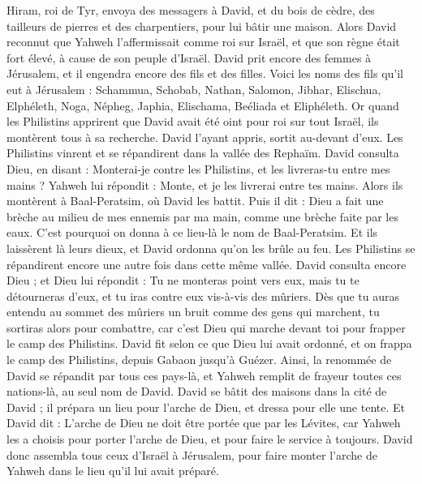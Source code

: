 \begin{multicols}{2}
\VerseOne{}Hiram, roi de Tyr, envoya des messagers à David, et du bois de cèdre, des tailleurs de pierres et des charpentiers, pour lui bâtir une maison.
Alors David reconnut que Yahweh l'affermissait comme roi sur Israël, et que son règne était fort élevé, à cause de son peuple d'Israël.
David prit encore des femmes à Jérusalem, et il engendra encore des fils et des filles.
Voici les noms des fils qu'il eut à Jérusalem : Schammua, Schobab, Nathan, Salomon,
Jibhar, Elischua, Elphéleth,
Noga, Népheg, Japhia,
Elischama, Beéliada et Eliphéleth.
Or quand les Philistins apprirent que David avait été oint pour roi sur tout Israël, ils montèrent tous à sa recherche. David l'ayant appris, sortit au-devant d'eux.
Les Philistins vinrent et se répandirent dans la vallée des Rephaïm.
David consulta Dieu, en disant : Monterai-je contre les Philistins, et les livreras-tu entre mes mains ? Yahweh lui répondit : Monte, et je les livrerai entre tes mains.
Alors ils montèrent à Baal-Peratsim, où David les battit. Puis il dit : Dieu a fait une brèche au milieu de mes ennemis par ma main, comme une brèche faite par les eaux. C'est pourquoi on donna à ce lieu-là le nom de Baal-Peratsim.
Et ils laissèrent là leurs dieux, et David ordonna qu'on les brûle au feu.
Les Philistins se répandirent encore une autre fois dans cette même vallée.
David consulta encore Dieu ; et Dieu lui répondit : Tu ne monteras point vers eux, mais tu te détourneras d'eux, et tu iras contre eux vis-à-vis des mûriers.
Dès que tu auras entendu au sommet des mûriers un bruit comme des gens qui marchent, tu sortiras alors pour combattre, car c'est Dieu qui marche devant toi pour frapper le camp des Philistins.
David fit selon ce que Dieu lui avait ordonné, et on frappa le camp des Philistins, depuis Gabaon jusqu'à Guézer.
Ainsi, la renommée de David se répandit par tous ces pays-là, et Yahweh remplit de frayeur toutes ces nations-là, au seul nom de David.
\VerseOne{}David se bâtit des maisons dans la cité de David ; il prépara un lieu pour l'arche de Dieu, et dressa pour elle une tente.
Et David dit : L'arche de Dieu ne doit être portée que par les Lévites, car Yahweh les a choisis pour porter l'arche de Dieu, et pour faire le service à toujours.
David donc assembla tous ceux d'Israël à Jérusalem, pour faire monter l'arche de Yahweh dans le lieu qu'il lui avait préparé.

\end{multicols}
